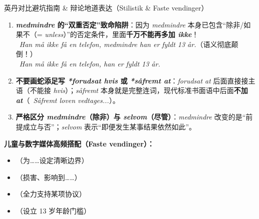 \begin{grammatikbox}{英丹对比避坑指南 \& 辩论地道表达（Stilistik \& Faste vendinger）}
\begin{enumerate}
  \item \textbf{\textit{medmindre} 的“双重否定”致命陷阱}：因为 \textit{medmindre} 本身已包含“除非/如果不（= \textit{unless}）”的否定条件，里面\textbf{千万不能再多加 \textit{ikke}}！\\
    \ \textit{Han må ikke få en telefon, medmindre han  er fyldt 13 år.}（语义彻底颠倒！）\\
    \ \textit{Han må ikke få en telefon,  han er fyldt 13 år.}
  \item \textbf{不要画蛇添足写 \textit{*forudsat hvis} 或 \textit{*såfremt at}}：\textit{forudsat at} 后面直接接主语（不能接 \textit{hvis}）；\textit{såfremt} 本身就是完整连词，现代标准书面语中后面\textbf{不加 \textit{at}}（\ \textit{Såfremt loven vedtages...}）。
  \item \textbf{严格区分 \textit{medmindre}（除非）与 \textit{selvom}（尽管）}：\textit{medmindre} 改变的是“前提成立与否”；\textit{selvom} 表示“即便发生某事结果依然如此”。
\end{enumerate}

\textbf{儿童与数字媒体高频搭配（Faste vendinger）：}
\begin{itemize}
  \item {}（为……设定清晰边界）
  \item {}（损害、影响到……）
  \item {}（全力支持某项协议）
  \item {}（设立 13 岁年龄门槛）
\end{itemize}
\end{grammatikbox}


